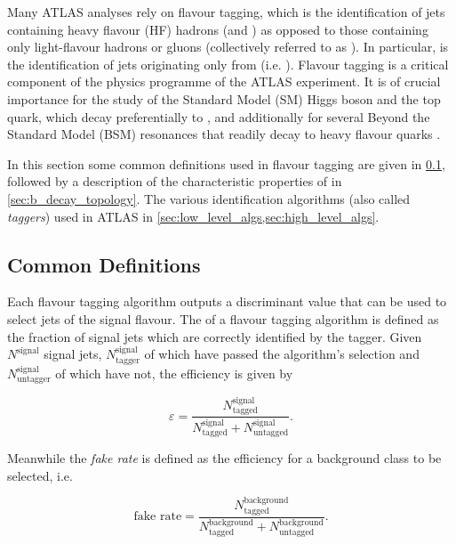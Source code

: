 Many ATLAS analyses rely on flavour tagging, which is the identification of jets containing heavy flavour (HF) hadrons (\bhadrons and \chadrons) as opposed to those containing only light-flavour hadrons or gluons (collectively referred to as \ljets).
In particular, \btagging is the identification of jets originating only from \bhadrons (i.e. \bjets).
Flavour tagging is a critical component of the physics programme of the ATLAS experiment. 
It is of crucial importance for the study of the Standard Model (SM) Higgs boson and the top quark, which decay preferentially to \bquarks \cite{HIGG-2018-04,HIGG-2018-13}, and additionally for several Beyond the Standard Model (BSM) resonances that readily decay to heavy flavour quarks \cite{EXOT-2019-03}.

In this section some common definitions used in flavour tagging are given in \cref{sec:ftag_defs}, followed by a description of the characteristic properties of \bjets in \cref{sec:b_decay_topology}.
The various \bjet identification algorithms (also called \textit{taggers}) used in ATLAS in \cref{sec:low_level_algs,sec:high_level_algs}.


\subsection{Common Definitions}\label{sec:ftag_defs}

Each flavour tagging algorithm outputs a discriminant value that can be used to select jets of the signal flavour.
The  of a flavour tagging algorithm is defined as the fraction of signal jets which are correctly identified by the tagger.
Given $N^{\text{signal}}$ signal jets, $N^{\text{signal}}_{\text{tagger}}$ of which have passed the algorithm's selection and $N^{\text{signal}}_{\text{untagger}}$ of which have not, the efficiency is given by

\begin{equation}
\varepsilon = \frac{N^{\text{signal}}_{\text{tagged}}}{N^{\text{signal}}_{\text{tagged}} + N^{\text{signal}}_{\text{untagged}}} .
\end{equation}

Meanwhile the \textit{fake rate} is defined as the efficiency for a background class to be selected, i.e.

\begin{equation}
\text{fake rate} = \frac{N^{\text{background}}_{\text{tagged}}}{N^{\text{background}}_{\text{tagged}} + N^{\text{background}}_{\text{untagged}}} .
\end{equation}

